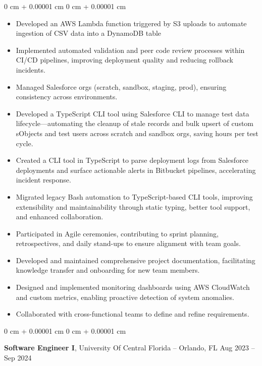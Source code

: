 \documentclass[10pt, letterpaper]{article}
\newenvironment{highlights}{
    \begin{itemize}[
        topsep=0.10 cm,
        parsep=0.10 cm,
        partopsep=0pt,
        itemsep=0pt,
        leftmargin=0 cm + 10pt
    ]
}{
    \end{itemize}
} %
\newenvironment{onecolentry}{
    \begin{adjustwidth}{
        0 cm + 0.00001 cm
    }{
        0 cm + 0.00001 cm
    }
}{
    \end{adjustwidth}
} %
\newenvironment{twocolentry}[2][]{
    \onecolentry
    \def\secondColumn{#2}
    \setcolumnwidth{\fill, 4.5 cm}
    \begin{paracol}{2}
}{
    \switchcolumn \raggedleft \secondColumn
    \end{paracol}
    \endonecolentry
} %
\begin{document}
\vspace{0.10 cm}
\begin{onecolentry}
	\begin{highlights}
		\item Developed an AWS Lambda function triggered by S3 uploads to automate
		ingestion of CSV data into a DynamoDB table
		\item Implemented automated validation and peer code review processes within
		CI/CD pipelines, improving deployment quality and reducing rollback
		incidents.
		\item Managed Salesforce orgs (scratch, sandbox, staging, prod), ensuring
		consistency across environments.
		\item Developed a TypeScript CLI tool using Salesforce CLI to manage test data
		lifecycle—automating the cleanup of stale records and bulk upsert of
		custom sObjects and test users across scratch and sandbox orgs, saving
		hours per test cycle.
		\item Created a CLI tool in TypeScript to parse deployment logs from Salesforce
		deployments and surface actionable alerts in Bitbucket pipelines,
		accelerating incident response.
		\item Migrated legacy Bash automation to TypeScript-based CLI tools, improving
		extensibility and maintainability through static typing, better tool support,
		and enhanced collaboration.
		\item Participated in Agile ceremonies, contributing to sprint planning,
		retrospectives, and daily stand-ups to ensure alignment with team goals.
		\item Developed and maintained comprehensive project documentation, facilitating knowledge transfer and onboarding for new team members.
		\item Designed and implemented monitoring dashboards using AWS CloudWatch and custom metrics, enabling proactive detection of system anomalies.
		\item Collaborated with cross-functional teams to define and refine requirements.
	\end{highlights}
\end{onecolentry}


\vspace{0.2 cm}

\begin{twocolentry}{
		Aug 2023 – Sep 2024
	}
	\textbf{Software Engineer I}, University Of Central Florida -- Orlando, FL\end{twocolentry}
\end{document}
